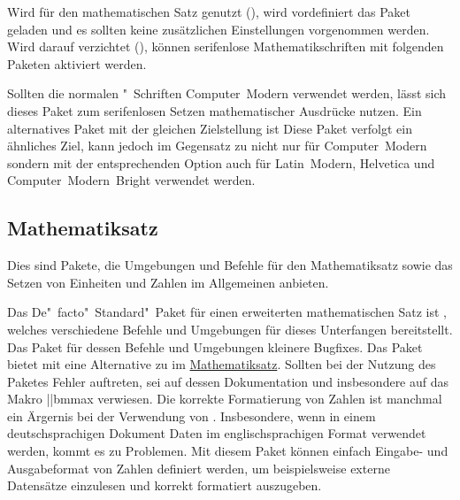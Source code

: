 %
Wird für den mathematischen Satz \OpenSans genutzt (), wird 
vordefiniert das Paket  geladen und es sollten keine 
zusätzlichen Einstellungen vorgenommen werden. Wird darauf verzichtet 
(), können serifenlose Mathematikschriften mit folgenden 
Paketen aktiviert werden.

\begin{DeclarePackages}
  Sollten die normalen "~Schriften Computer~Modern verwendet 
  werden, lässt sich dieses Paket zum serifenlosen Setzen mathematischer 
  Ausdrücke nutzen. Ein alternatives Paket mit der gleichen Zielstellung ist 
  Diese Paket verfolgt ein ähnliches Ziel, kann jedoch im Gegensatz zu 
   nicht nur für Computer~Modern sondern mit der 
  entsprechenden Option auch für Latin~Modern, Helvetica und 
  Computer~Modern~Bright verwendet werden.
\end{DeclarePackages}



\subsection{%
  Mathematiksatz%
}
%
Dies sind Pakete, die Umgebungen und Befehle für den Mathematiksatz sowie das 
Setzen von Einheiten und Zahlen im Allgemeinen anbieten.

\begin{DeclarePackages}
  Das De"~facto"~Standard"~Paket für einen erweiterten mathematischen Satz ist 
  , welches verschiedene Befehle und Umgebungen für dieses 
  Unterfangen bereitstellt. Das Paket  für dessen Befehle 
  und Umgebungen kleinere Bugfixes.
  Das Paket bietet mit  eine Alternative zu  im 
  \href{http://tex.stackexchange.com/q/3238}{Mathematiksatz}. Sollten bei
  der Nutzung des Paketes Fehler auftreten, sei auf dessen Dokumentation und 
  insbesondere auf das Makro \Macro||{bmmax} verwiesen.
  Die korrekte Formatierung von Zahlen ist manchmal ein Ärgernis bei der 
  Verwendung von . Insbesondere, wenn in einem deutschsprachigen 
  Dokument Daten im englischsprachigen Format verwendet werden, kommt es zu 
  Problemen. Mit diesem Paket können einfach Eingabe- und Ausgabeformat von 
  Zahlen definiert werden, um beispielsweise externe Datensätze einzulesen und 
  korrekt formatiert auszugeben.
\end{DeclarePackages}

